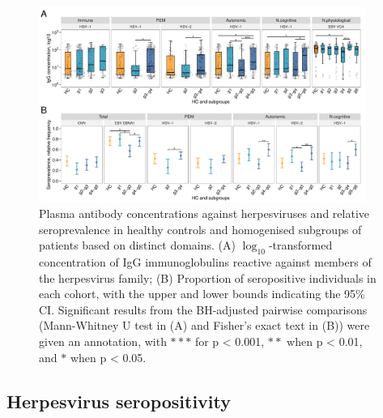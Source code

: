 \begin{figure}[h]
    \centering
    \includegraphics[width=0.95\textwidth]{chapter/2024-sym-domains/figures/fig7-aic-sero-and-seropos-adj-signif-merged-v2.pdf}
    \caption[Plasma antibody concentrations against herpesviruses and relative seroprevalence in healthy controls and homogenised \cfs subgroups of patients based on distinct domains]{Plasma antibody concentrations against herpesviruses and relative seroprevalence in healthy controls and homogenised \cfs subgroups of patients based on distinct domains. (A) ${\log_{10}}$-transformed concentration of IgG immunoglobulins reactive against members of the herpesvirus family; (B) Proportion of seropositive individuals in each cohort, with the upper and lower bounds indicating the 95\% CI. Significant results from the BH-adjusted pairwise comparisons (Mann-Whitney U test in (A) and Fisher’s exact text in (B)) were given an annotation, with $\ast\ast\ast$ for p < 0.001, $\ast\ast$ when p < 0.01, and $\ast$ when p < 0.05.}
    \label{fig:fig7-aic-sero-and-seropos-adj-signif-merged-v2}
\end{figure}

\subsection{Herpesvirus seropositivity}

